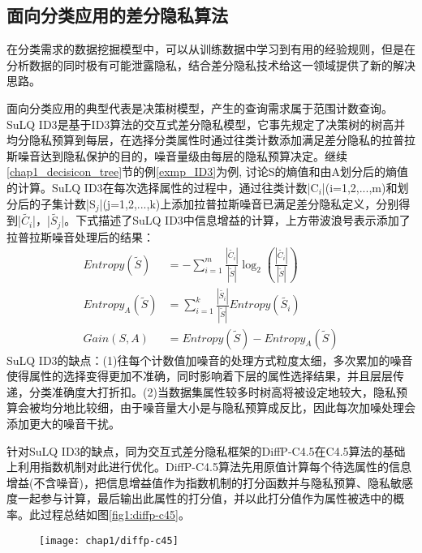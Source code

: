 \subsection{面向分类应用的差分隐私算法}  %

在分类需求的数据挖掘模型中，可以从训练数据中学习到有用的经验规则，但是在分析数据的同时极有可能泄露隐私，结合差分隐私技术给这一领域提供了新的解决思路。

面向分类应用的典型代表是决策树模型，产生的查询需求属于范围计数查询。SuLQ ID3\supercite{SuLQ}是基于ID3算法的交互式差分隐私模型，它事先规定了决策树的树高并均分隐私预算到每层，在选择分类属性时通过往类计数添加满足差分隐私的拉普拉斯噪音达到隐私保护的目的，噪音量级由每层的隐私预算决定。继续\ref{chap1_decisicon_tree}节的例\ref{exmp_ID3}为例,
讨论S的熵值和由A划分后的熵值的计算。SuLQ ID3在每次选择属性的过程中，通过往类计数|C$_{i}$|(i=1,2,...,m)和划分后的子集计数|S$_{j}$|(j=1,2,...,k)上添加拉普拉斯噪音已满足差分隐私定义，分别得到|$\widetilde{C_{i}}$|，|$\widetilde{S_{j}}$|。下式描述了SuLQ ID3中信息增益的计算，上方带波浪号表示添加了拉普拉斯噪音处理后的结果：
\[
\begin{split}
	Entropy(\tilde{S}) &= -\sum_{i=1}^{m}\frac{|\widetilde{C_{i}}|}{|\widetilde{S}|}\log_{2}(\frac{|\widetilde{C_{i}}|}{|\widetilde{S}|})\\
	Entropy_{A}(\tilde{S}) &= \sum_{i=1}^{k}\frac{|\widetilde{S_{i}}|}{|\widetilde{S}|}Entropy(\tilde{S_{i}})\\
	Gain(S,A) &= Entropy(\tilde{S})-Entropy_{A}(\tilde{S})
\end{split}	
\]
SuLQ ID3的缺点：(1)往每个计数值加噪音的处理方式粒度太细，多次累加的噪音使得属性的选择变得更加不准确，同时影响着下层的属性选择结果，并且层层传递，分类准确度大打折扣。(2)当数据集属性较多时树高将被设定地较大，隐私预算会被均分地比较细，由于噪音量大小是与隐私预算成反比，因此每次加噪处理会添加更大的噪音干扰。

针对SuLQ ID3的缺点，同为交互式差分隐私框架的DiffP-C4.5\supercite{diffp-c4.5}在C4.5算法的基础上利用指数机制对此进行优化。DiffP-C4.5算法先用原值计算每个待选属性的信息增益(不含噪音)，把信息增益值作为指数机制的打分函数并与隐私预算、隐私敏感度一起参与计算，最后输出此属性的打分值，并以此打分值作为属性被选中的概率。此过程总结如图\ref{fig1:diffp-c45}。

\begin{figure}[!htp]
	\centering
	\texttt{[image: chap1/diffp-c45]}
\end{figure}

